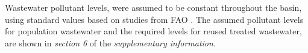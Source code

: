 
Wastewater pollutant levels, were assumed to be constant throughout the basin, using standard values based on studies from FAO \cite{fao1985water}. The assumed pollutant levels for population wastewater and the required levels for reused treated wastewater, are shown in \textit{section 6} of the \textit{supplementary information}.


